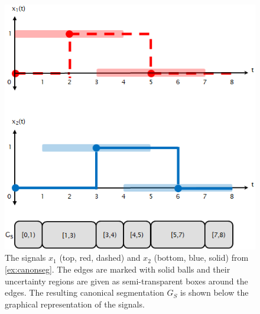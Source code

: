 
\begin{figure}
	\vspace{-2em}
	\begin{center}
		\includegraphics[scale=0.5]{canonseg.png}
	\end{center}
	\caption{The signals $x_1$ (top, red, dashed) and $x_2$ (bottom, blue, solid) from \cref{ex:canonseg}. The edges are marked with solid balls and their uncertainty regions are given as semi-transparent boxes around the edges. The resulting canonical segmentation $G_S$ is shown below the graphical representation of the signals.}
	\label{fig:canonseg}
\end{figure}

